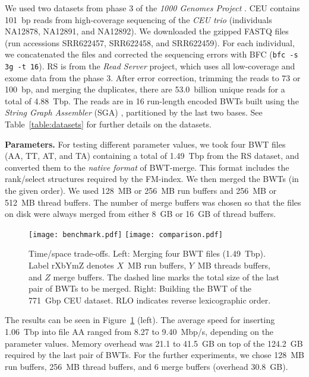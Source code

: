 \documentclass[smallabstract,smallcaptions]{dccpaper}
\newcommand{\BWT}{\textsf{BWT}}
\newcommand{\rank}{\textsf{rank}}
\newcommand{\select}{\textsf{select}}
\newcommand{\BWTmerge}{\textsf{BWT\nobreakdash-merge}}
\newcommand{\CEU}{\textsf{CEU}}
\newcommand{\RS}{\textsf{RS}}
\begin{document}
We used two datasets from phase 3 of the \emph{1000 Genomes Project} \cite{1000GP2015}. \CEU{} contains 101~bp reads from high-coverage sequencing of the \emph{CEU trio} (individuals NA12878, NA12891, and NA12892). We downloaded the gzipped FASTQ files (run accessions SRR622457, SRR622458, and SRR622459). For each individual, we concatenated the files and corrected the sequencing errors with BFC \cite{Li2015} (\texttt{bfc -s 3g -t 16}). \RS{} is from the \emph{Read Server} project, which uses all low-coverage and exome data from the phase 3. After error correction, trimming the reads to 73 or 100~bp, and merging the duplicates, there are 53.0~billion unique reads for a total of 4.88~Tbp. The reads are in 16 run-length encoded \BWT{}s built using the \emph{String Graph Assembler} (SGA) \cite{Simpson2012}, partitioned by the last two bases. See Table~\ref{table:datasets} for further details on the datasets.

\smallbreak\noindent\textbf{Parameters.} For testing different parameter values, we took four \BWT{} files (AA, TT, AT, and TA) containing a total of 1.49~Tbp from the \RS{} dataset, and converted them to the \emph{native format} of \BWTmerge. This format includes the \rank/\select{} structures required by the FM-index. We then merged the \BWT{}s (in the given order). We used 128~MB or 256~MB run buffers and 256~MB or 512~MB thread buffers. The number of merge buffers was chosen so that the files on disk were always merged from either 8~GB or 16~GB of thread buffers.

\begin{figure}[t!]
\begin{center}
\texttt{[image: benchmark.pdf]}%
\hspace{-0.3in}%
\texttt{[image: comparison.pdf]}
\end{center}%
\vspace{-12pt}
\caption{Time/space trade-offs. Left: Merging four \BWT{} files (1.49~Tbp). Label rXbYmZ denotes $X$~MB run buffers, $Y$~MB threads buffers, and $Z$ merge buffers. The dashed line marks the total size of the last pair of \BWT{}s to be merged. Right: Building the \BWT{} of the 771~Gbp \CEU{} dataset. RLO indicates reverse lexicographic order.}\label{fig:benchmark}%
\vspace{-6pt}
\end{figure}

The results can be seen in Figure~\ref{fig:benchmark} (left). The average speed for inserting 1.06~Tbp into file AA ranged from 8.27 to 9.40~Mbp/s, depending on the parameter values. Memory overhead was 21.1 to 41.5~GB on top of the 124.2~GB required by the last pair of \BWT{}s.
%
For the further experiments, we chose 128~MB run buffers, 256~MB thread buffers, and 6 merge buffers (overhead 30.8~GB).
\end{document}
